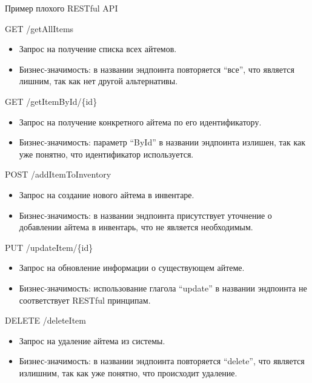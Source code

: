 \documentclass[
  ignorenonframetext,
  aspectratio=169,
  aspectratio=169]{beamer}
\providecommand{\tightlist}{%
  \setlength{\itemsep}{0pt}\setlength{\parskip}{0pt}}
\begin{document}
\begin{frame}{Пример плохого RESTful API}
\protect\hypertarget{ux43fux440ux438ux43cux435ux440-ux43fux43bux43eux445ux43eux433ux43e-restful-api}{}
\begin{block}{GET /getAllItems}
\protect\hypertarget{get-getallitems}{}
\begin{itemize}
\tightlist
\item
  Запрос на получение списка всех айтемов.
\item
  Бизнес-значимость: в названии эндпоинта повторяется ``все'', что
  является лишним, так как нет другой альтернативы.
\end{itemize}
\end{block}

\begin{block}{GET /getItemById/\{id\}}
\protect\hypertarget{get-getitembyidid}{}
\begin{itemize}
\tightlist
\item
  Запрос на получение конкретного айтема по его идентификатору.
\item
  Бизнес-значимость: параметр ``ById'' в названии эндпоинта излишен, так
  как уже понятно, что идентификатор используется.
\end{itemize}
\end{block}

\begin{block}{POST /addItemToInventory}
\protect\hypertarget{post-additemtoinventory}{}
\begin{itemize}
\tightlist
\item
  Запрос на создание нового айтема в инвентаре.
\item
  Бизнес-значимость: в названии эндпоинта присутствует уточнение о
  добавлении айтема в инвентарь, что не является необходимым.
\end{itemize}
\end{block}

\begin{block}{PUT /updateItem/\{id\}}
\protect\hypertarget{put-updateitemid}{}
\begin{itemize}
\tightlist
\item
  Запрос на обновление информации о существующем айтеме.
\item
  Бизнес-значимость: использование глагола ``update'' в названии
  эндпоинта не соответствует RESTful принципам.
\end{itemize}
\end{block}

\begin{block}{DELETE /deleteItem}
\protect\hypertarget{delete-deleteitem}{}
\begin{itemize}
\tightlist
\item
  Запрос на удаление айтема из системы.
\item
  Бизнес-значимость: в названии эндпоинта повторяется ``delete'', что
  является излишним, так как уже понятно, что происходит удаление.
\end{itemize}
\end{block}
\end{frame}
\end{document}
